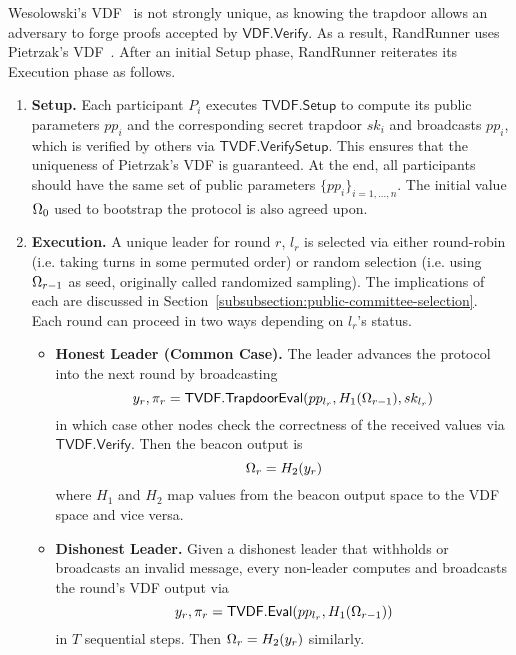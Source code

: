 Wesolowski's VDF~\cite{wesolowski2019efficient} is not strongly unique, as knowing the trapdoor allows an adversary to forge proofs accepted by $\mathsf{VDF.Verify}$. As a result, RandRunner uses Pietrzak's VDF~\cite{pietrzak2018simple}. After an initial Setup phase, RandRunner reiterates its Execution phase as follows.
\begin{enumerate}
    \item \textbf{Setup.} Each participant $P_i$ executes $\mathsf{TVDF.Setup}$ to compute its public parameters $pp_i$ and the corresponding secret trapdoor $sk_i$ and broadcasts $pp_i$, which is verified by others via $\mathsf{TVDF.VerifySetup}$. This ensures that the uniqueness of Pietrzak's VDF is guaranteed. At the end, all participants should have the same set of public parameters $\{pp_i\}_{i = 1, ..., n}$. The initial value $\Omega_0$ used to bootstrap the protocol is also agreed upon.
    \item \textbf{Execution.} A unique leader for round $r$, $l_r$ is selected via either round-robin (i.e. taking turns in some permuted order) or random selection (i.e. using $\Omega_{r - 1}$ as seed, originally called randomized sampling). The implications of each are discussed in Section~\ref{subsubsection:public-committee-selection}. Each round can proceed in two ways depending on $l_r$'s status.
    \begin{itemize}
        \item \textbf{Honest Leader (Common Case).} The leader advances the protocol into the next round by broadcasting
        $$y_r, \pi_r = \mathsf{TVDF.TrapdoorEval}(pp_{l_r}, H_1(\Omega_{r - 1}), sk_{l_r})$$
        in which case other nodes check the correctness of the received values via $\mathsf{TVDF.Verify}$. Then the beacon output is
        $$\Omega_r = H_2(y_r)$$
        where $H_1$ and $H_2$ map values from the beacon output space to the VDF space and vice versa.
        \item \textbf{Dishonest Leader.} Given a dishonest leader that withholds or broadcasts an invalid message, every non-leader computes and broadcasts the round's VDF output via
        $$y_r, \pi_r = \mathsf{TVDF.Eval}(pp_{l_r}, H_1(\Omega_{r - 1}))$$
        in $T$ sequential steps. Then $\Omega_r = H_2(y_r)$ similarly.
    \end{itemize}
\end{enumerate}

